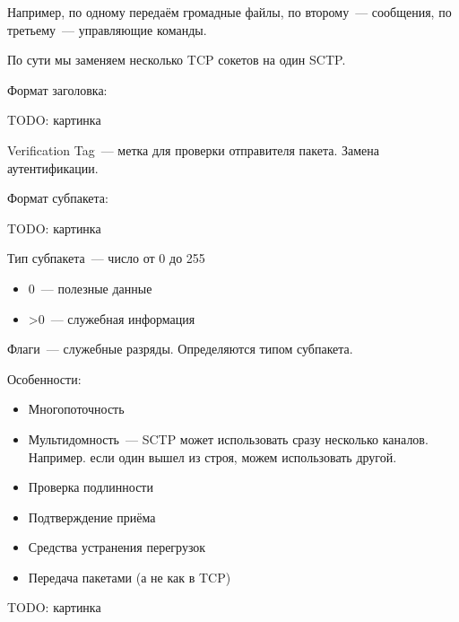 Например, по одному передаём громадные файлы, по второму~--- сообщения, по третьему~--- управляющие команды.

По сути мы заменяем несколько TCP сокетов на один SCTP.

Формат заголовка:

TODO: картинка

Verification Tag~--- метка для проверки отправителя пакета. Замена аутентификации.

Формат субпакета:

TODO: картинка

Тип субпакета~--- число от 0 до 255
\begin{itemize}
    \item 0~--- полезные данные
    \item >0~--- служебная информация
\end{itemize}

Флаги~--- служебные разряды. Определяются типом субпакета.

Особенности:
\begin{itemize}
    \item Многопоточность
    \item Мультидомность~--- SCTP может использовать сразу несколько каналов. Например. если один вышел из строя, можем использовать другой.
    \item Проверка подлинности
    \item Подтверждение приёма
    \item Средства устранения перегрузок
    \item Передача пакетами (а не как в TCP)
\end{itemize}

TODO: картинка